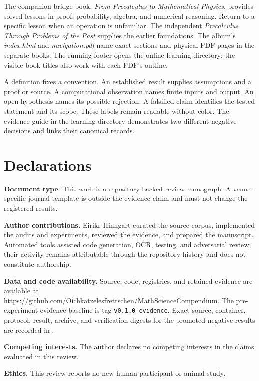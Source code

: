 \documentclass[11pt,oneside]{book}
\begin{document}
The companion bridge book, \emph{From Precalculus to Mathematical Physics},
provides solved lessons in proof, probability, algebra, and numerical reasoning.
Return to a specific lesson when an operation is unfamiliar. The independent
\emph{Precalculus Through Problems of the Past} supplies the earlier foundations.
The album's \emph{index.html} and \emph{navigation.pdf} name exact sections and
physical PDF pages in the separate books. The running footer opens the online
learning directory; the visible book titles also work with each PDF's outline.

A definition fixes a convention. An established result supplies assumptions and
a proof or source. A computational observation names finite inputs and output.
An open hypothesis names its possible rejection. A falsified claim identifies
the tested statement and its scope. These labels remain readable without color.
The evidence guide in the learning directory demonstrates two different negative
decisions and links their canonical records.

\tableofcontents

\mainmatter










\appendix


\backmatter
\chapter*{Declarations}

\textbf{Document type.} This work is a repository-backed review monograph. A
venue-specific journal template is outside the evidence claim and must not
change the registered results.

\textbf{Author contributions.} Eirikr Hinngart curated the source corpus,
implemented the audits and experiments, reviewed the evidence, and prepared
the manuscript. Automated tools assisted code generation, OCR, testing, and
adversarial review; their activity remains attributable through the repository
history and does not constitute authorship.

\textbf{Data and code availability.} Source, code, registries, and retained
evidence are available at
\url{https://github.com/Oichkatzelesfrettschen/MathScienceCompendium}. The
pre-experiment evidence baseline is tag \texttt{v0.1.0-evidence}. Exact source,
container, protocol, result, archive, and verification digests for the promoted
negative results are recorded in
.

\textbf{Competing interests.} The author declares no competing interests in
the claims evaluated in this review.

\textbf{Ethics.} This review reports no new human-participant or animal study.



\end{document}
